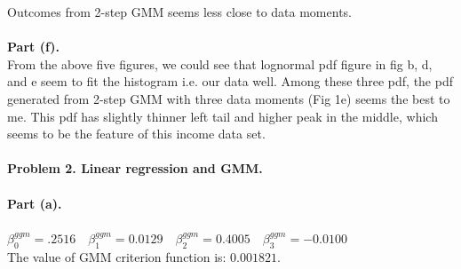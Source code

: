 \documentclass[letterpaper,12pt]{article}
\theoremstyle{definition}
\begin{document}
Outcomes from 2-step GMM seems less close to data moments.\\
\\
\noindent\textbf{Part (f).}\\
From the above five figures, we could see that lognormal pdf figure in fig b, d, and e seem to fit the histogram i.e. our data well. Among these three pdf, the pdf generated from 2-step GMM with three data moments (Fig 1e) seems the best to me. This pdf has slightly thinner left tail and higher peak in the middle, which seems to be the feature of this income data set.\\
\\
\noindent\textbf{Problem 2. Linear regression and GMM.}\\
\\
\noindent\textbf{Part (a).}\\
\\
$\beta^{ggm}_{0} = .2516\quad \beta^{ggm}_{1} = 0.0129\quad\beta^{ggm}_{2} = 0.4005\quad \beta^{ggm}_{3} = -0.0100\quad$
\\
The value of GMM criterion function is: $0.001821$.\\
\end{document}
